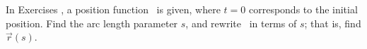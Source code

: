 {\noindent In Exercises}
{ , a position function \vrt\ is given, where $t=0$ corresponds to the initial position. Find the arc length parameter $s$, and rewrite \vrt\ in terms of $s$; that is, find $\vec r(s)$. 
}
